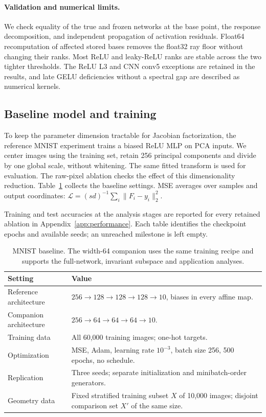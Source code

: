 \paragraph{Validation and numerical limits.}
We check equality of the true and frozen networks at the base point, the response decomposition, and independent propagation of activation residuals. Float64 recomputation of affected stored bases removes the float32 ray floor without changing their ranks. Most ReLU and leaky-ReLU ranks are stable across the two tighter thresholds. The ReLU L3 and CNN conv5 exceptions are retained in the results, and late GELU deficiencies without a spectral gap are described as numerical kernels.

\subsection{Baseline model and training}
\label{app:protocol}
To keep the parameter dimension tractable for Jacobian factorization, the reference MNIST experiment \citep{lecunmnist} trains a biased ReLU MLP on PCA inputs. We center images using the training set, retain 256 principal components and divide by one global scale, without whitening. The same fitted transform is used for evaluation. The raw-pixel ablation checks the effect of this dimensionality reduction. Table~\ref{tab:early-method-baseline} collects the baseline settings. MSE averages over samples and output coordinates: $\mathcal L=(sd)^{-1}\sum_i\|F_i-y_i\|_2^2$.

Training and test accuracies at the analysis stages are reported for every retained ablation in Appendix~\ref{app:performance}. Each table identifies the checkpoint epochs and available seeds; an unreached milestone is left empty.

\begin{table}[!htbp]\centering
\caption{MNIST baseline. The width-64 companion uses the same training recipe and supports the full-network, invariant subspace and application analyses.}\label{tab:early-method-baseline}
\small\begin{tabular}{p{.28\linewidth}p{.65\linewidth}}\toprule
Setting & Value\\\midrule
Reference architecture & $256\to128\to128\to128\to10$, biases in every affine map.\\
Companion architecture & $256\to64\to64\to64\to10$.\\
Training data & All 60,000 training images; one-hot targets.\\
Optimization & MSE, Adam, learning rate $10^{-3}$, batch size 256, 500 epochs, no schedule.\\
Replication & Three seeds; separate initialization and minibatch-order generators.\\
Geometry data & Fixed stratified training subset $X$ of 10,000 images; disjoint comparison set $X'$ of the same size.\\\bottomrule
\end{tabular}
\end{table}

